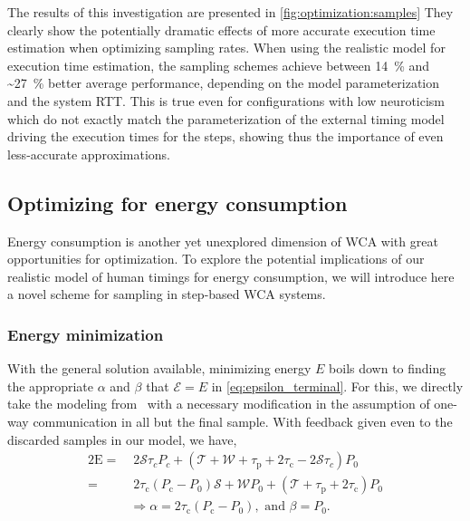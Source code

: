 The results of this investigation are presented in \cref{fig:optimization:samples}
They clearly show the potentially dramatic effects of more accurate execution time estimation when optimizing sampling rates.
When using the realistic model for execution time estimation, the sampling schemes achieve between \SI{14}{\percent} and \textasciitilde\SI{27}{\percent} better average performance, depending on the \edgedroid{} model parameterization and the system \ac{RTT}.
This is true even for configurations with low neuroticism which do not exactly match the parameterization of the external timing model driving the execution times for the steps, showing thus the importance of even less-accurate approximations.

\subsection{Optimizing for energy consumption}

Energy consumption is another yet unexplored dimension of \ac{WCA} with great opportunities for optimization.
To explore the potential implications of our realistic model of human timings for energy consumption, we will introduce here a novel scheme for sampling in step-based \ac{WCA} systems.

\subsubsection{Energy minimization}\label{sec:aprxSol_Energy}

With the general solution available, minimizing energy $E$ boils down to finding the appropriate $\alpha$ and $\beta$ that $\mathcal{E}=E$ in \cref{eq:epsilon_terminal}.
For this, we directly take the modeling from~\cite{secAperiodic} with a necessary modification in the assumption of one-way communication in all but the final sample.
With feedback given even to the discarded samples in our model, we have, 
\begin{alignat}{2}
    \mathrm{E}=&\;2\mathcal{S}\tau_cP_c+(\mathcal{T}+\mathcal{W}+\tau_\mathrm{p}+2\tau_\mathrm{c}-2\mathcal{S}\tau_c)P_0\nonumber\\
    =&\;2\tau_{\text{c}}(P_{\text{c}} -P_0)\mathcal{S}+\mathcal{W}P_0+(\mathcal{T}+\tau_{\text{p}} +2\tau_{\text{c}}) P_0\nonumber\\
&\Rightarrow \alpha=2\tau_{\text{c}}(P_{\text{c}} -P_0),\text{ and }\beta=P_0.\nonumber
\end{alignat}

